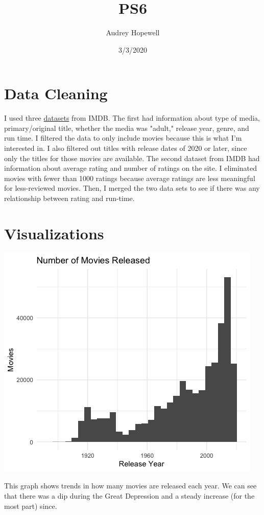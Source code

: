 \documentclass{article}
\title{PS6}
\author{Audrey Hopewell }
\date{3/3/2020}
\begin{document}
\maketitle

\section{Data Cleaning}
I used three \href{https://datasets.imdbws.com/}{datasets} from IMDB. The first had information about type of media, primary/original title, whether the media was "adult," release year, genre, and run time. I filtered the data to only include movies because this is what I'm interested in. I also filtered out titles with release dates of 2020 or later, since only the titles for those movies are available. The second dataset from IMDB had information about average rating and number of ratings on the site. I eliminated movies with fewer than 1000 ratings because average ratings are less meaningful for less-reviewed movies. Then, I merged the two data sets to see if there was any relationship between rating and run-time.

\section{Visualizations}


\includegraphics[scale=.7]{PS6a_Hopewell.png}

\caption{This graph shows trends in how many movies are released each year. We can see that there was a dip during the Great Depression and a steady increase (for the most part) since.}
\end{document}
